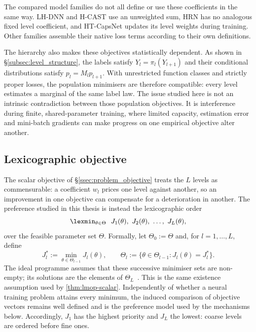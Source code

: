 The compared model families do not all define or use these coefficients in the
same way. LH-DNN and H-CAST use an unweighted sum, HRN has no analogous fixed
level coefficient, and HT-CapsNet updates its level weights during training.
Other families assemble their native loss terms according to their own
definitions.

The hierarchy also makes these objectives statistically dependent. As shown in
\S\ref{subsec:level_structure}, the labels satisfy
$Y_l=\pi_l(Y_{l+1})$ and their conditional distributions satisfy
$p_l=M_lp_{l+1}$. With unrestricted function classes and strictly proper losses,
the population minimisers are therefore compatible: every level estimates a
marginal of the same label law. The issue studied here is not an intrinsic
contradiction between those population objectives. It is interference during
finite, shared-parameter training, where limited capacity, estimation error and
mini-batch gradients can make progress on one empirical objective alter another.

\subsection{Lexicographic objective}
\label{ssec:problem_priority}

The scalar objective of \S\ref{ssec:problem_objective} treats the $L$ levels as
commensurable: a coefficient $w_l$ prices one level against another, so an
improvement in one objective can compensate for a deterioration in another. The
preference studied in this thesis is instead the lexicographic order
\begin{equation}
\lexmin_{\theta\in\Theta}\ \ J_1(\theta),\ J_2(\theta),\ \dots,\ J_L(\theta),
\label{eq:hc_lmop}
\end{equation}
over the feasible parameter set $\Theta$. Formally, let $\Theta_0:=\Theta$ and,
for $l=1,\dots,L$, define
\[
J_l^*:=\min_{\theta\in\Theta_{l-1}}J_l(\theta),
\qquad
\Theta_l:=\bigl\{\theta\in\Theta_{l-1}:J_l(\theta)=J_l^*\bigr\}.
\]
The ideal programme assumes that these successive minimiser sets are non-empty;
its solutions are the elements of $\Theta_L$~\cite{fiaschi2024informed}. This is
the same existence assumption used by \cref{thm:lmop-scalar}. Independently of
whether a neural training problem attains every minimum, the induced comparison
of objective vectors remains well defined and is the preference model used by
the mechanisms below. Accordingly, $J_1$ has the highest priority and $J_L$ the
lowest: coarse levels are ordered before fine ones.

